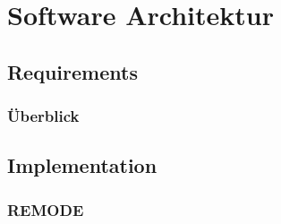
\chapter{Software Architektur}
\section{Requirements}
\label{sec:Requirements} 



\subsection{Überblick}
\label{setup}

\section{Implementation}
\label{Implementation}

\newpage
\subsection{REMODE}




